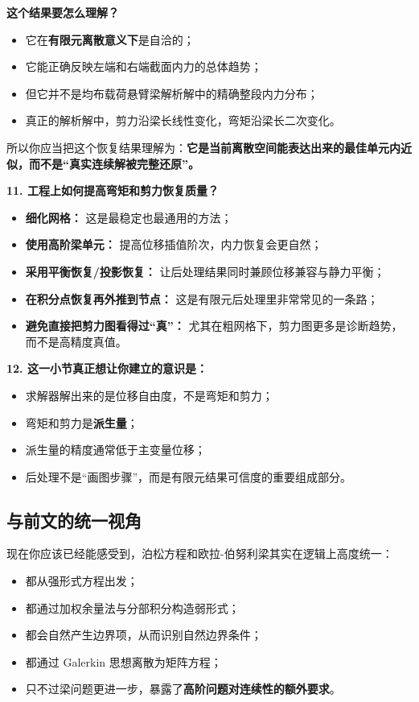\documentclass[11pt, a4paper, UTF8]{ctexart}
\begin{document}
\textbf{这个结果要怎么理解？}
\begin{itemize}
    \item 它在\textbf{有限元离散意义下}是自洽的；
    \item 它能正确反映左端和右端截面内力的总体趋势；
    \item 但它并不是均布载荷悬臂梁解析解中的精确整段内力分布；
    \item 真正的解析解中，剪力沿梁长线性变化，弯矩沿梁长二次变化。
\end{itemize}
所以你应当把这个恢复结果理解为：\textbf{它是当前离散空间能表达出来的最佳单元内近似，而不是“真实连续解被完整还原”。}

\textbf{11. 工程上如何提高弯矩和剪力恢复质量？}
\begin{itemize}
    \item \textbf{细化网格：} 这是最稳定也最通用的方法；
    \item \textbf{使用高阶梁单元：} 提高位移插值阶次，内力恢复会更自然；
    \item \textbf{采用平衡恢复/投影恢复：} 让后处理结果同时兼顾位移兼容与静力平衡；
    \item \textbf{在积分点恢复再外推到节点：} 这是有限元后处理里非常常见的一条路；
    \item \textbf{避免直接把剪力图看得过“真”：} 尤其在粗网格下，剪力图更多是诊断趋势，而不是高精度真值。
\end{itemize}

\textbf{12. 这一小节真正想让你建立的意识是：}
\begin{itemize}
    \item 求解器解出来的是位移自由度，不是弯矩和剪力；
    \item 弯矩和剪力是\textbf{派生量}；
    \item 派生量的精度通常低于主变量位移；
    \item 后处理不是“画图步骤”，而是有限元结果可信度的重要组成部分。
\end{itemize}

\subsection{与前文的统一视角}
现在你应该已经能感受到，泊松方程和欧拉-伯努利梁其实在逻辑上高度统一：
\begin{itemize}
    \item 都从强形式方程出发；
    \item 都通过加权余量法与分部积分构造弱形式；
    \item 都会自然产生边界项，从而识别自然边界条件；
    \item 都通过 Galerkin 思想离散为矩阵方程；
    \item 只不过梁问题更进一步，暴露了\textbf{高阶问题对连续性的额外要求}。
\end{itemize}
\end{document}
